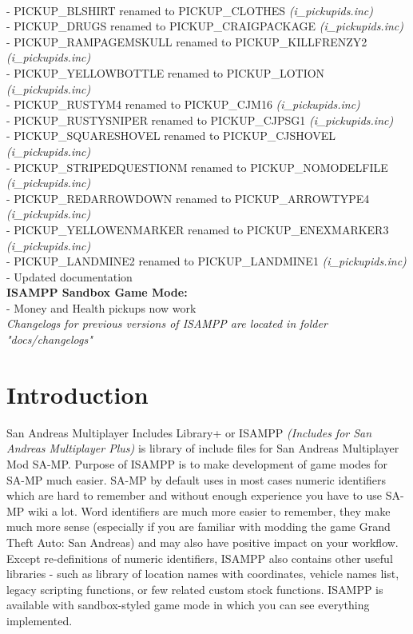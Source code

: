 \documentclass{article}
\begin{document}
\\- PICKUP\_BLSHIRT renamed to PICKUP\_CLOTHES \textit{(i\_pickupids.inc)}
\\- PICKUP\_DRUGS renamed to PICKUP\_CRAIGPACKAGE \textit{(i\_pickupids.inc)}
\\- PICKUP\_RAMPAGEMSKULL renamed to PICKUP\_KILLFRENZY2 \textit{(i\_pickupids.inc)}
\\- PICKUP\_YELLOWBOTTLE renamed to PICKUP\_LOTION \textit{(i\_pickupids.inc)}
\\- PICKUP\_RUSTYM4 renamed to PICKUP\_CJM16 \textit{(i\_pickupids.inc)}
\\- PICKUP\_RUSTYSNIPER renamed to PICKUP\_CJPSG1 \textit{(i\_pickupids.inc)}
\\- PICKUP\_SQUARESHOVEL renamed to PICKUP\_CJSHOVEL \textit{(i\_pickupids.inc)}
\\- PICKUP\_STRIPEDQUESTIONM renamed to PICKUP\_NOMODELFILE \textit{(i\_pickupids.inc)}
\\- PICKUP\_REDARROWDOWN renamed to PICKUP\_ARROWTYPE4 \textit{(i\_pickupids.inc)}
\\- PICKUP\_YELLOWENMARKER renamed to PICKUP\_ENEXMARKER3 \textit{(i\_pickupids.inc)}
\\- PICKUP\_LANDMINE2 renamed to PICKUP\_LANDMINE1 \textit{(i\_pickupids.inc)}
\\- Updated documentation
\bigskip
\\\textbf{ISAMPP Sandbox Game Mode:}
\\- Money and Health pickups now work 
\bigskip
\\\textit{Changelogs for previous versions of ISAMPP are located in folder "docs/changelogs"}

\newpage
\section{Introduction}
San Andreas Multiplayer Includes Library+ or ISAMPP \textit{(Includes for San Andreas Multiplayer Plus)} is library of include files for San Andreas Multiplayer Mod SA-MP. Purpose of ISAMPP is to make development of game modes for SA-MP much easier. SA-MP by default uses in most cases numeric identifiers which are hard to remember and without enough experience you have to use SA-MP wiki a lot. Word identifiers are much more easier to remember, they make much more sense (especially if you are familiar with modding the game Grand Theft Auto: San Andreas) and may also have positive impact on your workflow. Except re-definitions of numeric identifiers, ISAMPP also contains other useful libraries - such as library of location names with coordinates, vehicle names list, legacy scripting functions, or few related custom stock functions. ISAMPP is available with sandbox-styled game mode in which you can see everything implemented.
\end{document}
